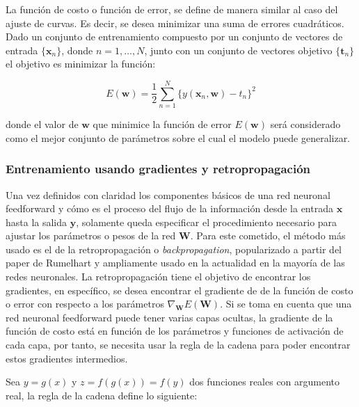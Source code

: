         La función de costo o función de error, se define de manera similar al caso del ajuste de curvas. Es decir, se desea 
        minimizar una suma de errores cuadráticos. Dado un conjunto de entrenamiento compuesto por un conjunto de vectores 
        de entrada $\{\mathbf{x}_n \}$, donde $n = 1, \ldots , N$, junto con un conjunto de vectores objetivo $\{\mathbf{t}_n \}$
        el objetivo es minimizar la función:

        \begin{equation}\label{eq:error}
            E(\mathbf{w}) = \frac{1}{2} \sum_{n=1}^N \{y(\mathbf{x}_n, \mathbf{w}) - t_n\}^2
        \end{equation}

        donde el valor de $\mathbf{w}$ que minimice la función de error $E(\mathbf{w})$ será considerado como el mejor conjunto 
        de parámetros sobre el cual el modelo puede generalizar.

        \subsubsection{Entrenamiento usando gradientes y retropropagación} \label{sec:gradientes}

        Una vez definidos con claridad los componentes básicos de una red neuronal feedforward y cómo es el proceso del flujo 
        de la información desde la entrada $\mathbf{x}$ hasta la salida $\mathbf{y}$, solamente queda especificar el procedimiento 
        necesario para ajustar los parámetros o pesos de la red $\mathbf{W}$. Para este cometido, el método más usado es el 
        de la retropropagación o \textit{backpropagation}, popularizado a partir del paper de Rumelhart \cite{rumelhart1986learning} 
        y ampliamente usado en la actualidad en la mayoría de las redes neuronales. La retropropagación tiene el objetivo de 
        encontrar los gradientes, en específico, se desea encontrar el gradiente de de la función de costo o error con respecto 
        a los parámetros $\nabla_{\mathbf{W}}E(\mathbf{W})$. Si se toma en cuenta que una red neuronal feedforward puede tener 
        varias capas ocultas, la gradiente de la función de costo está en función de los parámetros y funciones de activación 
        de cada capa, por tanto, se necesita usar la regla de la cadena para poder encontrar estos gradientes intermedios.

        Sea $y = g(x)$ y $z = f(g(x)) = f(y)$ dos funciones reales con argumento real, la regla de la cadena define lo siguiente:

